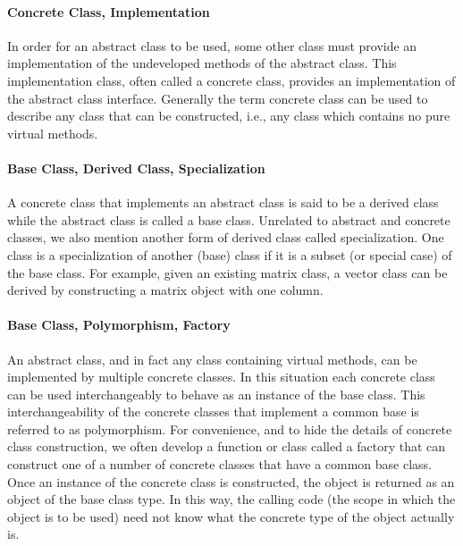 \documentclass[12pt,relax]{SANDreport}
\begin{document}
\paragraph{Concrete Class, Implementation}  In order for an abstract class to
be used, some other class must provide an implementation of the undeveloped
methods of the abstract class. This implementation class, often called a
concrete class, provides an implementation of the abstract class interface.
Generally the term concrete class can be used to describe any class that can
be constructed, i.e., any class which contains no pure virtual methods.

\paragraph{Base Class, Derived Class, Specialization} 
A concrete class that implements an abstract class is said to be a derived
class while the abstract class is called a base class.  Unrelated to abstract
and concrete classes, we also mention another form of derived class called
specialization.  One class is a specialization of another (base) class if it
is a subset (or special case) of the base class.  For example, given an
existing matrix class, a vector class can be derived by constructing a matrix
object with one column.

\paragraph{Base Class, Polymorphism, Factory}
An abstract class, and in fact any class containing virtual methods, can be
implemented by multiple concrete classes.  In this situation each concrete
class can be used interchangeably to behave as an instance of the base class.
This interchangeability of the concrete classes that implement a common base
is referred to as polymorphism.  For convenience, and to hide the details of
concrete class construction, we often develop a function or class called a
factory that can construct one of a number of concrete classes that have a
common base class.  Once an instance of the concrete class is constructed, the
object is returned as an object of the base class type. In this way, the
calling code (the scope in which the object is to be used) need not know what
the concrete type of the object actually is.
\end{document}
